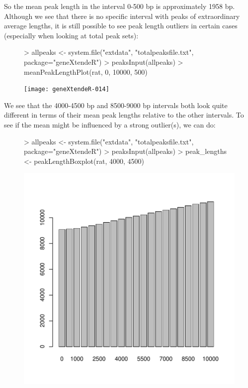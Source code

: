 \documentclass[12pt]{article}
\begin{document}
So the mean peak length in the interval 0-500 bp is approximately 1958 bp.  Although we see that there is no specific interval with peaks of extraordinary average lengths, it is still possible to see peak length outliers in certain cases (especially when looking at total peak sets):  

\begin{figure}[H]
\begin{center}
\begin{Schunk}
\begin{Sinput}
> allpeaks <- system.file("extdata", "totalpeaksfile.txt", package="geneXtendeR")
> peaksInput(allpeaks)
> meanPeakLengthPlot(rat, 0, 10000, 500)
\end{Sinput}
\end{Schunk}
\texttt{[image: geneXtendeR-014]}
\end{center}
\end{figure}

We see that the 4000-4500 bp and 8500-9000 bp intervals both look quite different in terms of their mean peak lengths relative to the other intervals.  To see if the mean might be influenced by a strong outlier(s), we can do:

\begin{figure}[H]
\begin{center}
\begin{Schunk}
\begin{Sinput}
> allpeaks <- system.file("extdata", "totalpeaksfile.txt", package="geneXtendeR")
> peaksInput(allpeaks)
> peak_lengths <- peakLengthBoxplot(rat, 4000, 4500)
\end{Sinput}
\end{Schunk}
\includegraphics{geneXtendeR-015}
\end{center}
\end{figure}
\end{document}
